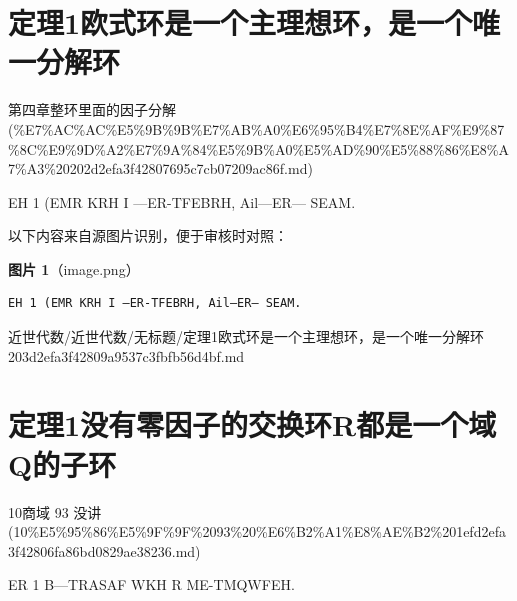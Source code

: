 \section*{定理1欧式环是一个主理想环，是一个唯一分解环}

\begin{note}[来源上级主题]

第四章整环里面的因子分解 (\%E7\%AC\%AC\%E5\%9B\%9B\%E7\%AB\%A0\%E6\%95\%B4\%E7\%8E\%AF\%E9\%87\%8C\%E9\%9D\%A2\%E7\%9A\%84\%E5\%9B\%A0\%E5\%AD\%90\%E5\%88\%86\%E8\%A7\%A3\%20202d2efa3f42807695c7cb07209ac86f.md)

\end{note}

\begin{theorem}

EH 1 (EMR KRH I —ER-TFEBRH, Ail—ER— SEAM.

\end{theorem}

\begin{note}
以下内容来自源图片识别，便于审核时对照：

\textbf{图片 1}（image.png）
\begin{Verbatim}[fontsize=\small]
EH 1 (EMR KRH I —ER-TFEBRH, Ail—ER— SEAM.
\end{Verbatim}

\end{note}

\begin{note}[来源路径]

近世代数/近世代数/无标题/定理1欧式环是一个主理想环，是一个唯一分解环 203d2efa3f42809a9537c3fbfb56d4bf.md

\end{note}

\section*{定理1没有零因子的交换环R都是一个域Q的子环}

\begin{note}[来源上级主题]

10商域 93 没讲 (10\%E5\%95\%86\%E5\%9F\%9F\%2093\%20\%E6\%B2\%A1\%E8\%AE\%B2\%201efd2efa3f42806fa86bd0829ae38236.md)

\end{note}

\begin{theorem}[定理1没有零因子的交换环R都是一个域Q的子环]

ER 1 B—TRASAF WKH R ME-TMQWFEH.

\end{theorem}


